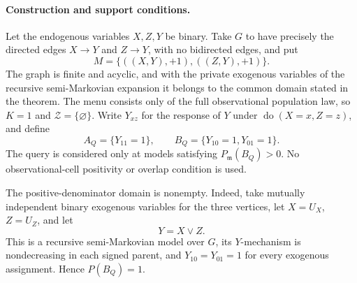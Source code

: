 \paragraph{Construction and support conditions.}
Let the endogenous variables \(X,Z,Y\) be binary.  Take \(G\) to have precisely the directed edges \(X\to Y\) and \(Z\to Y\), with no bidirected edges, and put
\[
 M=\{((X,Y),+1),((Z,Y),+1)\}.
\]
The graph is finite and acyclic, and with the private exogenous variables of the recursive semi-Markovian expansion it belongs to the common domain stated in the theorem.  The menu consists only of the full observational population law, so \(K=1\) and \(\mathcal Z=\{\varnothing\}\).  Write \(Y_{xz}\) for the response of \(Y\) under \(\operatorname{do}(X=x,Z=z)\), and define
\[
 A_Q=\{Y_{11}=1\},
 \qquad
 B_Q=\{Y_{10}=1,Y_{01}=1\}.
\]
The query is considered only at models satisfying \(P_{\mathfrak m}(B_Q)>0\).  No observational-cell positivity or overlap condition is used.

The positive-denominator domain is nonempty.  Indeed, take mutually independent binary exogenous variables for the three vertices, let \(X=U_X\), \(Z=U_Z\), and let
\[
 Y=X\lor Z.
\]
This is a recursive semi-Markovian model over \(G\), its \(Y\)-mechanism is nondecreasing in each signed parent, and \(Y_{10}=Y_{01}=1\) for every exogenous assignment.  Hence \(P(B_Q)=1\).

